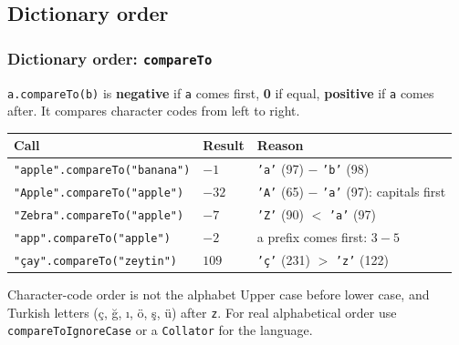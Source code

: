 \documentclass[aspectratio=169,10pt,compress]{beamer}
\begin{document}
\subsection[Order]{Dictionary order}




\begin{frame}[t,fragile] \frametitle{Dictionary order: \texttt{compareTo}}
  \small \texttt{a.compareTo(b)} is \textbf{negative} if \texttt{a} comes first, \textbf{0} if equal, \textbf{positive} if \texttt{a} comes after.
  It compares character codes from left to right.

  \vspace{0.4em}
  \begin{tabular}{@{}L{0.32\textwidth}L{0.08\textwidth}L{0.5\textwidth}@{}}
    \toprule
    \textbf{Call}                                  & \textbf{Result} & \textbf{Reason} \\
    \midrule
    \texttt{"apple".compareTo("banana")}           & $-1$  & \texttt{'a'} (97) $-$ \texttt{'b'} (98) \\
    \texttt{"Apple".compareTo("apple")}            & $-32$ & \texttt{'A'} (65) $-$ \texttt{'a'} (97): capitals first \\
    \texttt{"Zebra".compareTo("apple")}            & $-7$  & \texttt{'Z'} (90) $<$ \texttt{'a'} (97) \\
    \texttt{"app".compareTo("apple")}              & $-2$  & a prefix comes first: $3 - 5$ \\
    \texttt{"çay".compareTo("zeytin")}             & $109$ & \texttt{'ç'} (231) $>$ \texttt{'z'} (122) \\
    \bottomrule
  \end{tabular}

  \vspace{0.6em}
  \begin{alertblock}{Character-code order is not the alphabet}
    \small Upper case before lower case, and Turkish letters (ç, ğ, ı, ö, ş, ü) after \texttt{z}.
    For real alphabetical order use \texttt{compareToIgnoreCase} or a \texttt{Collator} for the language.
  \end{alertblock}
\end{frame}

\end{document}
